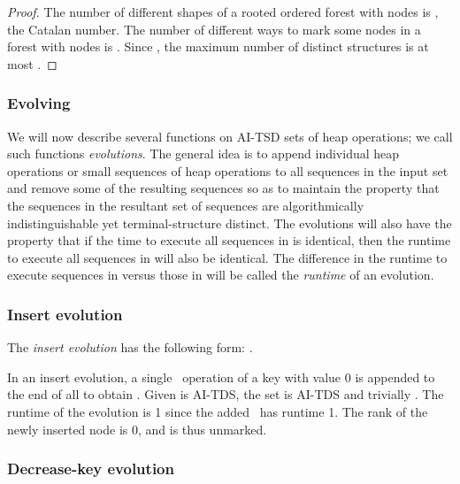 \begin{fullonly}
\begin{proof}
The number of different shapes of a rooted ordered forest with  nodes is , the  Catalan number. The number of different ways to mark some nodes in a forest with  nodes is . Since , the maximum number of distinct structures is at most . 
\end{proof}
\end{fullonly}



\subsubsection{Evolving} 

We will now describe several functions on AI-TSD sets of heap operations; we call such functions \emph{evolutions}. The general idea is to append individual heap operations or small sequences of heap operations to all sequences in the input set  and remove some of the resulting sequences so as to maintain the property that the sequences in the resultant set of sequences  are algorithmically indistinguishable yet terminal-structure distinct. The evolutions will also have the property that if the time to execute all sequences in  is identical, then the runtime to execute all sequences in  will also be identical. The difference in the runtime to execute sequences in  versus those in  will be called the \emph{runtime} of an evolution.



\subsubsection{Insert evolution} 

The \emph{insert evolution} has the following form: .
\begin{fullonly}

\end{fullonly}
In an insert evolution, a single \opIns\ operation of a key with value 0 is appended to the end of all  to obtain . Given  is AI-TDS, the set  is AI-TDS and trivially . The runtime of the evolution is 1 since the added \opIns\ has runtime 1. The rank of the newly inserted node is 0, and is thus unmarked.



\subsubsection{Decrease-key evolution} 

